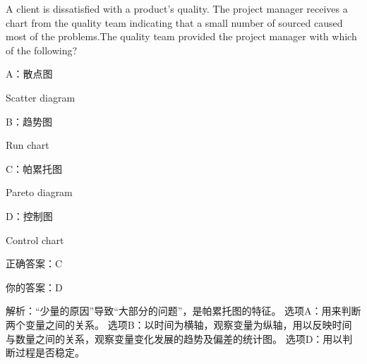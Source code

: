 A client is dissatisfied with a product's quality. The project manager receives a chart from the quality team indicating that a small number of sourced caused most of the problems.The quality team provided the project manager with which of the following?

A：散点图

Scatter diagram

B：趋势图

Run chart

C：帕累托图

Pareto diagram

D：控制图

Control chart

正确答案：C

你的答案：D

解析：“少量的原因”导致“大部分的问题”，是帕累托图的特征。 选项A：用来判断两个变量之间的关系。 选项B：以时间为横轴，观察变量为纵轴，用以反映时间与数量之间的关系，观察变量变化发展的趋势及偏差的统计图。 选项D：用以判断过程是否稳定。


